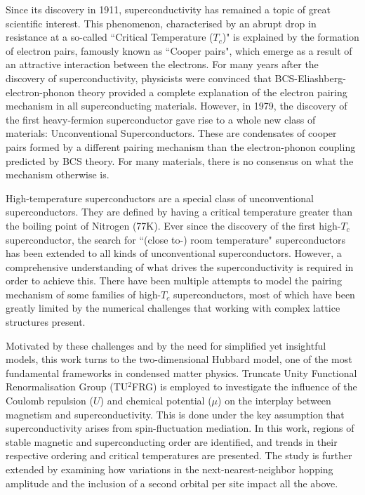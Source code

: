 \documentclass[11pt]{article}
\begin{document}
Since its discovery in 1911\cite{onnes1911superconductivity}, superconductivity has remained a topic of great scientific interest.
This phenomenon, characterised by an abrupt drop in resistance at a so-called ``Critical Temperature ($T_c$)"\cite{geballe2015tc}
is explained by the formation of electron pairs, famously known as ``Cooper pairs"\cite{schrieffer2018theory}, which emerge as a result of an attractive interaction between the electrons. For many 
years after the discovery of superconductivity, physicists
were convinced that BCS-Eliashberg-electron-phonon theory \cite{schrieffer2018theory} provided a complete explanation of the electron pairing mechanism in all superconducting materials. 
However, in 1979, the discovery of the first heavy-fermion superconductor\cite{steglich1979superconductivity} gave rise to a whole new class of materials: Unconventional Superconductors. 
These are condensates of cooper pairs formed by a different pairing mechanism than the electron-phonon coupling predicted by BCS theory\cite{hirsch2015superconducting}.
For many materials, there is no consensus on what the mechanism otherwise is\cite{norman2011challenge}.\par

\medskip
\noindent High-temperature superconductors are a special class of unconventional superconductors. They are defined by having a critical temperature greater than the boiling point 
of Nitrogen (77K). Ever since the discovery of the first high-$T_c$ superconductor\cite{bednorz1986possible}, the search for ``(close to-) room temperature" superconductors has been extended to 
all kinds of unconventional superconductors. However, a comprehensive understanding of what drives the superconductivity is required in order 
to achieve this. There have been multiple attempts to model the pairing mechanism of some families of high-$T_c$ superconductors, most of which have
been greatly limited by the numerical challenges that working with complex lattice structures present.\par 

\medskip
\noindent Motivated by these challenges and by the need for simplified yet insightful models, this work turns to the two-dimensional Hubbard model, one of the most fundamental frameworks in condensed matter physics. Truncate Unity Functional Renormalisation Group (TU$^2$FRG)\cite{eckhardt2020truncated} is employed to 
investigate the influence of the Coulomb repulsion ($U$) and chemical potential ($\mu$) on the interplay between magnetism and superconductivity.
This is done under the key assumption that superconductivity arises from spin-fluctuation mediation.
In this work, regions of stable magnetic and superconducting order are identified, and trends in their respective ordering and critical temperatures are presented.
The study is further extended by examining how variations in the next-nearest-neighbor hopping amplitude and the inclusion of a second orbital per site impact all the above.
\end{document}
